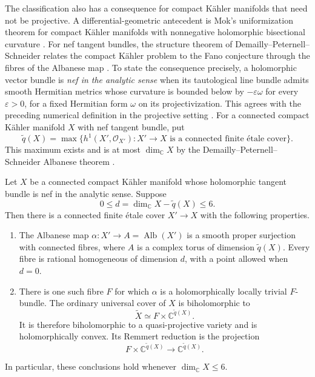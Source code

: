 The classification also has a consequence for compact K\"ahler manifolds
that need not be projective. A differential-geometric antecedent is
Mok's uniformization theorem for compact K\"ahler manifolds with
nonnegative holomorphic bisectional curvature \cite{Mok1988}.
For nef tangent bundles, the structure theorem of
Demailly--Peternell--Schneider relates the compact K\"ahler problem to
the Fano conjecture through the fibres of the Albanese map
\cite[Main Theorem and Theorem~3.14]{DemaillyPeternellSchneider1994}.
To state the consequence precisely, a holomorphic vector bundle
is \emph{nef in the analytic sense} when its tautological line bundle
admits smooth Hermitian metrics whose curvature is bounded below by
$-\varepsilon\omega$ for every $\varepsilon>0$, for a fixed Hermitian
form $\omega$ on its projectivization. This agrees with the preceding
numerical definition in the projective setting
\cite[Section~1.A and Definitions~1.2 and~1.9]{DemaillyPeternellSchneider1994}.
For a connected compact K\"ahler manifold $X$ with nef tangent bundle, put
\[
 \widetilde q(X)=
 \max\bigl\{h^1(X',\mathcal O_{X'}):
       X'\longrightarrow X\text{ is a connected finite \'{e}tale cover}\bigr\}.
\]
This maximum exists and is at most $\dim_{\mathbb C}X$
by the Demailly--Peternell--Schneider Albanese theorem
\cite[Proposition~3.9 and Theorem~3.14]{DemaillyPeternellSchneider1994}.

\begin{corollary}\label{cor:nef-tangent-uniformization}
Let $X$ be a connected compact K\"ahler manifold whose holomorphic
tangent bundle is nef in the analytic sense. Suppose
\[
 0\leq d=\dim_{\mathbb C}X-\widetilde q(X)\leq6.
\]
Then there is a connected finite \'{e}tale cover $X'\to X$ with the
following properties.
\begin{enumerate}
\item The Albanese map
      $\alpha:X'\to A=\operatorname{Alb}(X')$ is a smooth proper
      surjection with connected fibres, where $A$ is a complex torus of
      dimension $\widetilde q(X)$. Every fibre is rational homogeneous
      of dimension $d$, with a point allowed when $d=0$.
\item There is one such fibre $F$ for which $\alpha$ is a holomorphically
      locally trivial $F$-bundle. The ordinary universal cover of $X$
      is biholomorphic to
      \[
       \widetilde X\simeq F\times\mathbb C^{\widetilde q(X)}.
      \]
      It is therefore biholomorphic to a quasi-projective variety and
      is holomorphically convex. Its Remmert reduction is the projection
      \[
       F\times\mathbb C^{\widetilde q(X)}
       \longrightarrow\mathbb C^{\widetilde q(X)}.
      \]
\end{enumerate}
In particular, these conclusions hold whenever $\dim_{\mathbb C}X\leq6$.
\end{corollary}

